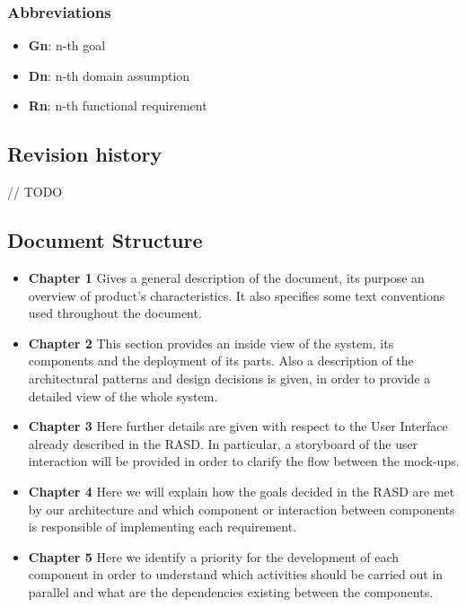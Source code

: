 \subsubsection{Abbreviations}
\begin{itemize}
	\item \textbf{Gn}: n-th goal
	\item \textbf{Dn}: n-th domain assumption
	\item \textbf{Rn}: n-th functional requirement
\end{itemize}

\FloatBarrier
\subsection{Revision history}
 // TODO
 
\subsection{Document Structure}
\begin{itemize}
	\item \textbf{Chapter 1} 
	Gives a general description of the document, its purpose an overview of product's characteristics. It also specifies some text conventions used throughout the document.
	
	\item \textbf{Chapter 2}
	This section provides an inside view of the system, its components and the deployment of its parts.
	Also a description of the architectural patterns and design decisions is given, in order to provide a detailed view of the whole system.
	
	\item \textbf{Chapter 3}
	Here further details are given with respect to the User Interface already described in the RASD.
	In particular, a storyboard of the user interaction will be provided in order to clarify the flow between the mock-ups.
	
	\item \textbf{Chapter 4}
	Here we will explain how the goals decided in the RASD are met by our architecture and which component or interaction between components is responsible of implementing each requirement. 
	
	\item \textbf{Chapter 5}
	Here we identify a priority for the development of each component in order to understand which activities should be carried out in parallel and what are the dependencies existing between the components.

\end{itemize}